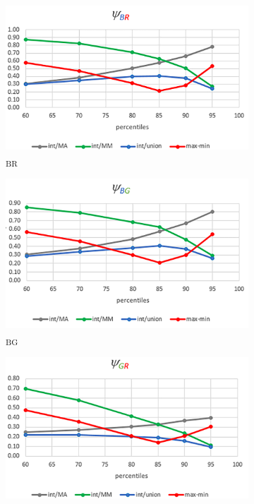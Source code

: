 \begin{figure}[h!]
     \centering
     \begin{subfigure}[b]{\textwidth}
         \centering
         \includegraphics[width=\textwidth]{Imagenes/qibr.png}
         \caption{\textpsi \textsubscript{BR}}
         \label{psiBR}
     \end{subfigure}
     \hfill
     \begin{subfigure}[b]{\textwidth}
         \centering
         \includegraphics[width=\textwidth]{Imagenes/qibg.png}
         \caption{\textpsi \textsubscript{BG}}
         \label{psiBG}
     \end{subfigure}
     \hfill
     \begin{subfigure}[b]{\textwidth}
         \centering
         \includegraphics[width=\textwidth]{Imagenes/qigr.png}

\end{subfigure}
\end{figure}
